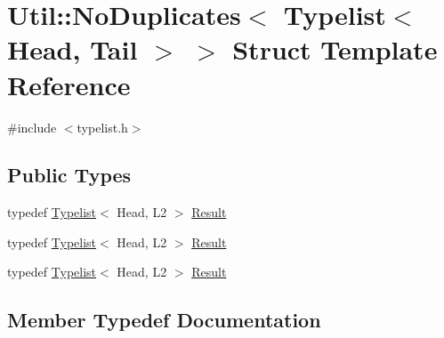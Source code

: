 \hypertarget{structUtil_1_1TL_1_1NoDuplicates_3_01Typelist_3_01Head_00_01Tail_01_4_01_4}{}\section{Util\+:\+:No\+Duplicates$<$ Typelist$<$ Head, Tail $>$ $>$ Struct Template Reference}
\label{structUtil_1_1TL_1_1NoDuplicates_3_01Typelist_3_01Head_00_01Tail_01_4_01_4}


{\ttfamily \#include $<$typelist.\+h$>$}

\subsection*{Public Types}
\begin{DoxyCompactItemize}
\item 
typedef \mbox{\hyperlink{structUtil_1_1Typelist}{Typelist}}$<$ Head, L2 $>$ \mbox{\hyperlink{structUtil_1_1TL_1_1NoDuplicates_3_01Typelist_3_01Head_00_01Tail_01_4_01_4_ada564784f87c4684be2e13c5e1bf722e}{Result}}
\item 
typedef \mbox{\hyperlink{structUtil_1_1Typelist}{Typelist}}$<$ Head, L2 $>$ \mbox{\hyperlink{structUtil_1_1TL_1_1NoDuplicates_3_01Typelist_3_01Head_00_01Tail_01_4_01_4_ada564784f87c4684be2e13c5e1bf722e}{Result}}
\item 
typedef \mbox{\hyperlink{structUtil_1_1Typelist}{Typelist}}$<$ Head, L2 $>$ \mbox{\hyperlink{structUtil_1_1TL_1_1NoDuplicates_3_01Typelist_3_01Head_00_01Tail_01_4_01_4_ada564784f87c4684be2e13c5e1bf722e}{Result}}
\end{DoxyCompactItemize}


\subsection{Member Typedef Documentation}
\mbox{\label{structUtil_1_1TL_1_1NoDuplicates_3_01Typelist_3_01Head_00_01Tail_01_4_01_4_ada564784f87c4684be2e13c5e1bf722e}} 
